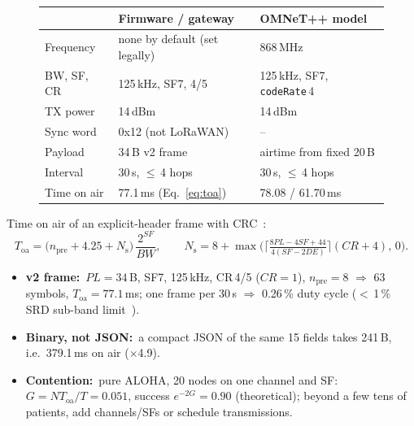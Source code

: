 \documentclass[10pt,a4paper]{article}
\newcommand{\lead}[1]{\textbf{#1}\,}
\begin{document}
\begin{figure}[!htb]
\begin{minipage}[c]{0.545\textwidth}
\centering
\resizebox{\linewidth}{!}{}
\label{fig:frame}
\end{minipage}\hfill
\begin{minipage}[c]{0.43\textwidth}
\centering\footnotesize
{}
\label{tab:radio}
\begin{tabularx}{\linewidth}{@{}L{1.45cm}YY@{}}
\toprule
 & Firmware / gateway & OMNeT++ model\\
\midrule
Frequency & none by default (set legally) & 868\,MHz\\
BW, SF, CR & 125\,kHz, SF7, 4/5 & 125\,kHz, SF7, \texttt{codeRate}\,4\\
TX power & 14\,dBm & 14\,dBm\\
Sync word & 0x12 (not LoRaWAN) & --\\
Payload & 34\,B v2 frame & airtime from fixed 20\,B\\
Interval & 30\,s, $\leq$\,4 hops & 30\,s, $\leq$\,4 hops\\
Time on air & 77.1\,ms (Eq.~\ref{eq:toa}) & 78.08 / 61.70\,ms\\
\bottomrule
\end{tabularx}
\end{minipage}
\end{figure}

Time on air of an explicit-header frame with CRC~\cite{semtech2013an1200}:
\begin{equation}
T_{\mathrm{oa}} = \big(n_{\mathrm{pre}} + 4.25 + N_{\mathrm{s}}\big)\,\frac{2^{SF}}{BW},\qquad
N_{\mathrm{s}} = 8 + \max\!\Big(\Big\lceil \tfrac{8PL - 4SF + 44}{4(SF - 2DE)} \Big\rceil (CR + 4),\, 0\Big).
\label{eq:toa}
\end{equation}
\begin{itemize}
\item \lead{v2 frame:} $PL=34$\,B, SF7, 125\,kHz, CR\,4/5 ($CR=1$), $n_{\mathrm{pre}}=8$ $\Rightarrow$ 63 symbols, $T_{\mathrm{oa}}=77.1$\,ms; one frame per 30\,s $\Rightarrow$ 0.26\,\% duty cycle ($<$\,1\,\% SRD sub-band limit~\cite{etsi300220}).
\item \lead{Binary, not JSON:} a compact JSON of the same 15 fields takes 241\,B, i.e.\ 379.1\,ms on air ($\times$4.9).
\item \lead{Contention:} pure ALOHA, 20 nodes on one channel and SF: $G = N T_{\mathrm{oa}}/T = 0.051$, success $e^{-2G} = 0.90$ (theoretical); beyond a few tens of patients, add channels/SFs or schedule transmissions.
\end{itemize}
\end{document}
